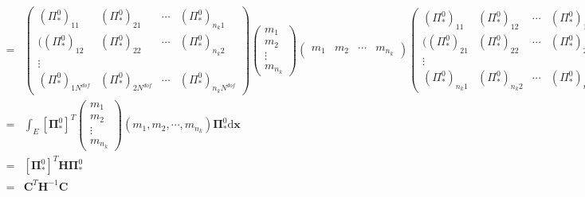 \begin{equation*}
\begin{aligned}
= & \begin{pmatrix} 
(\Pi_{*}^{0})_{1 1} & (\Pi_{*}^{0})_{2 1} & \cdots  & (\Pi_{*}^{0})_{n_k 1} \\ 
((\Pi_{*}^{0})_{1 2} & (\Pi_{*}^{0})_{2 2} & \cdots  & (\Pi_{*}^{0})_{n_k 2} \\ 
\vdots\\
(\Pi_{*}^{0})_{1 N^{dof}} & (\Pi_{*}^{0})_{2 N^{dof}} & \cdots  & (\Pi_{*}^{0})_{n_k N^{dof}}
\end{pmatrix}\begin{pmatrix} 
 m_{1}\\ 
 m_{2} \\ 
\vdots\\
 m_{n_k}
\end{pmatrix}\begin{pmatrix} 
m_{1} & m_{2} & \cdots & m_{n_k}
\end{pmatrix}
\begin{pmatrix} 
(\Pi_{*}^{0})_{1 1} & (\Pi_{*}^{0})_{1 2} & \cdots  & (\Pi_{*}^{0})_{1 N^{dof}} \\ 
((\Pi_{*}^{0})_{2 1} & (\Pi_{*}^{0})_{2 2} & \cdots  & (\Pi_{*}^{0})_{2 N^{dof}} \\ 
\vdots\\
(\Pi_{*}^{0})_{n_k 1} & (\Pi_{*}^{0})_{n_k 2} & \cdots  & (\Pi_{*}^{0})_{n_k N^{dof}}
\end{pmatrix} \mathrm d \mathbf x\\
= & \int_E [\boldsymbol \Pi_{*}^0]^T \begin{pmatrix}
m_1 \\
m_2 \\
\vdots\\
m_{n_k}
\end{pmatrix}
(m_1, m_2, \cdots, m_{n_k}) \boldsymbol \Pi_{*}^{0} \mathrm d \mathbf x \\
= & [\boldsymbol \Pi_{*}^0]^T \mathbf{H} \boldsymbol \Pi_{*}^0 \\
= & \mathbf{C}^T\mathbf{H}^{-1}\mathbf{C}
\end{aligned}
\end{equation*}

